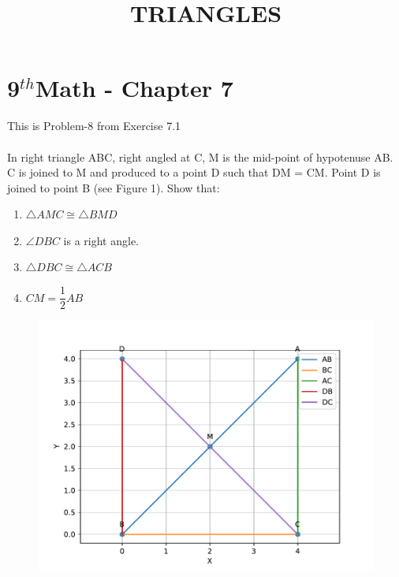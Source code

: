 \documentclass[10pt]{article}
\begin{document}
\begin{center}
\title{\textbf{TRIANGLES}}
\date{\vspace{-5ex}}
\maketitle
\end{center}
\section*{9$^{th}$Math - Chapter 7}
This is Problem-8 from Exercise 7.1\\\\
In right triangle ABC, right angled at C, M is the mid-point of hypotenuse AB. C is joined to M and produced to a point D such that DM = CM. Point D is joined to point B (see Figure 1). Show that:
\begin{enumerate}
\item $\triangle AMC \cong \triangle BMD$
\item $\angle DBC$ is a right angle.
\item $\triangle DBC \cong \triangle ACB$
\item $CM = \dfrac{1}{2}AB$
\end{enumerate}

\begin{figure}[!h]
	\begin{center}
		\includegraphics[width=\columnwidth]{./figs/fig.pdf}
	\end{center}
\caption{}
\label{figure}
\end{figure}
\end{document}
